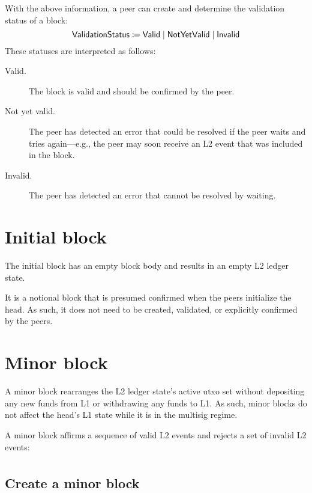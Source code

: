 \documentclass[../hydrozoa.tex]{subfiles}
\begin{document}
With the above information, a peer can create and determine the validation status of a block:
\begin{equation*}
  \mathsf{ValidationStatus} \coloneq
    \mathsf{Valid} \mid
    \mathsf{NotYetValid} \mid
    \mathsf{Invalid}
\end{equation*}
These statuses are interpreted as follows:
\begin{description}
  \item[Valid.] The block is valid and should be confirmed by the peer.
  \item[Not yet valid.] The peer has detected an error that could be resolved if the peer waits and tries again---e.g., the peer may soon receive an L2 event that was included in the block.
  \item[Invalid.] The peer has detected an error that cannot be resolved by waiting.
\end{description}

\section{Initial block}%
\label{h:l2-initial-block}%

The initial block has an empty block body and results in an empty L2 ledger state.

It is a notional block that is presumed confirmed when the peers initialize the head.
As such, it does not need to be created, validated, or explicitly confirmed by the peers.

\section{Minor block}%
\label{h:l2-minor-block}%

A minor block rearranges the L2 ledger state's active utxo set without depositing any new funds from L1 or withdrawing any funds to L1.
As such, minor blocks do not affect the head's L1 state while it is in the multisig regime.

A minor block affirms a sequence of valid L2 events and rejects a set of invalid L2 events:
\begin{equation*}
\begin{split}
\end{split}
\end{equation*}

\subsection{Create a minor block}%
\label{h:l2-minor-block-create}%
\end{document}

